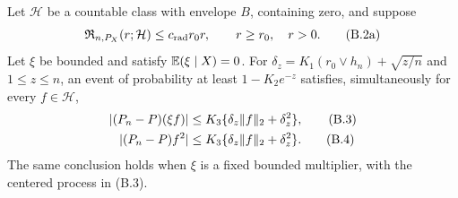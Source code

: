 \begin{lemma}
\label{lem:localized-process}
Let \(\mathcal H\) be a countable class with envelope \(B\), containing zero,
and suppose
\[
 \mathfrak R_{n,P_X}(r;\mathcal H)\le c_{\rm rad}r_0r,
 \qquad r\ge r_0,\quad r>0.
 \tag{B.2a}
\]
Let \(\xi\) be bounded and satisfy \(\mathbb E(\xi\mid X)=0\).  For
\(\delta_z=K_1(r_0\vee h_n)+\sqrt{z/n}\) and \(1\le z\le n\), an event
of probability at least \(1-K_2e^{-z}\) satisfies, simultaneously for every
\(f\in\mathcal H\),
\begin{align}
 \lvert (P_n-P)(\xi f)\rvert
 &\le K_3\{\delta_z\lVert f\rVert_2+\delta_z^2\},\tag{B.3}\\
 \lvert (P_n-P)f^2\rvert
 &\le K_3\{\delta_z\lVert f\rVert_2+\delta_z^2\}.\tag{B.4}
\end{align}
The same conclusion holds when \(\xi\) is a fixed bounded multiplier, with
the centered process in (B.3).
\end{lemma}
